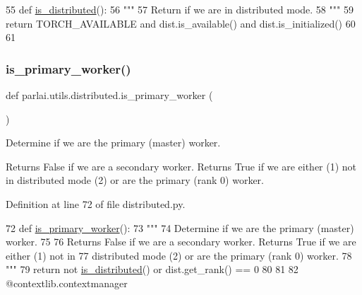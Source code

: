 \begin{DoxyCode}
55 \textcolor{keyword}{def }\hyperlink{namespaceparlai_1_1utils_1_1distributed_a023acb5e3b66e1f27e21247c35661279}{is\_distributed}():
56     \textcolor{stringliteral}{"""}
57 \textcolor{stringliteral}{    Return if we are in distributed mode.}
58 \textcolor{stringliteral}{    """}
59     \textcolor{keywordflow}{return} TORCH\_AVAILABLE \textcolor{keywordflow}{and} dist.is\_available() \textcolor{keywordflow}{and} dist.is\_initialized()
60 
61 
\end{DoxyCode}
\mbox{\label{namespaceparlai_1_1utils_1_1distributed_a9bb1dac198180590ef8c6b6c6f9fc2c4}} 
\subsubsection{\texorpdfstring{is\+\_\+primary\+\_\+worker()}{is\_primary\_worker()}}
{\footnotesize\ttfamily def parlai.\+utils.\+distributed.\+is\+\_\+primary\+\_\+worker (\begin{DoxyParamCaption}{ }\end{DoxyParamCaption})}

\begin{DoxyVerb}Determine if we are the primary (master) worker.

Returns False if we are a secondary worker. Returns True if we are either (1) not in
distributed mode (2) or are the primary (rank 0) worker.
\end{DoxyVerb}
 

Definition at line 72 of file distributed.\+py.


\begin{DoxyCode}
72 \textcolor{keyword}{def }\hyperlink{namespaceparlai_1_1utils_1_1distributed_a9bb1dac198180590ef8c6b6c6f9fc2c4}{is\_primary\_worker}():
73     \textcolor{stringliteral}{"""}
74 \textcolor{stringliteral}{    Determine if we are the primary (master) worker.}
75 \textcolor{stringliteral}{}
76 \textcolor{stringliteral}{    Returns False if we are a secondary worker. Returns True if we are either (1) not in}
77 \textcolor{stringliteral}{    distributed mode (2) or are the primary (rank 0) worker.}
78 \textcolor{stringliteral}{    """}
79     \textcolor{keywordflow}{return} \textcolor{keywordflow}{not} \hyperlink{namespaceparlai_1_1utils_1_1distributed_a023acb5e3b66e1f27e21247c35661279}{is\_distributed}() \textcolor{keywordflow}{or} dist.get\_rank() == 0
80 
81 
82 @contextlib.contextmanager
\end{DoxyCode}
\mbox{\label{namespaceparlai_1_1utils_1_1distributed_a99b61b4756577c6542039c238d670dba}} 
